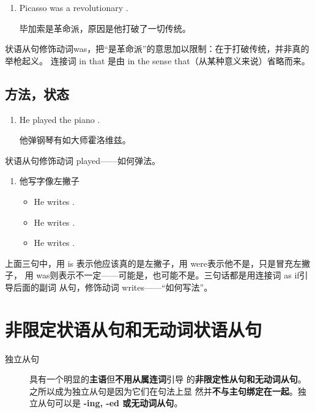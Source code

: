 \begin{enumerate}[resume]
\item Picasso was a revolutionary  .

  毕加索是革命派，原因是他打破了一切传统。
\end{enumerate}
状语从句修饰动词was，把“是革命派”的意思加以限制：在于打破传统，并非真的举枪起义。
连接词 in that 是由 in the sense that（从某种意义来说）省略而来。

\subsection{方法，状态}

\begin{enumerate}
\item He played the piano  .

  他弹钢琴有如大师霍洛维兹。
\end{enumerate}
状语从句修饰动词 played——如何弹法。

\begin{enumerate}[resume]
\item 他写字像左撇子
  \begin{itemize}
  \item He writes   .
  \item He writes   .
  \item He writes   .
  \end{itemize}
\end{enumerate}

上面三句中，用 is 表示他应该真的是左撇子，用 were表示他不是，只是冒充左撇子，
用 was则表示不一定——可能是，也可能不是。三句话都是用连接词 as if引导后面的副词
从句，修饰动词 writes——“如何写法”。

\section{非限定状语从句和无动词状语从句}

\begin{description}
\item[独立从句] 具有一个明显的\textbf{主语}但\textbf{不用从属连词}引导
  的\textbf{非限定性从句和无动词从句}。之所以成为独立从句是因为它们在句法上显
  然并\textbf{不与主句绑定在一起}。独立从句可以是\textbf{ -ing, -ed 或无动词从句}。
\end{description}

